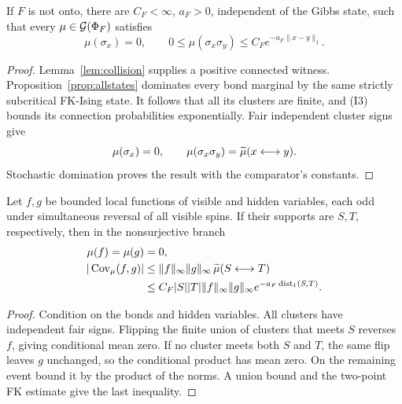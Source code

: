 \begin{proposition}\label{prop:nononto}
If \(F\) is not onto, there are \(C_F<\infty\), \(a_F>0\), independent of the Gibbs state, such that every \(\mu\in\mathcal G(\Phi_F)\) satisfies
\begin{equation}
 \mu(\sigma_x)=0,\qquad
 0\le\mu(\sigma_x\sigma_y)
   \le C_F e^{-a_F\|x-y\|_1}.
\end{equation}
\end{proposition}
\begin{proof}
Lemma~\ref{lem:collision} supplies a positive connected witness. Proposition~\ref{prop:allstates} dominates every bond marginal by the same strictly subcritical FK-Ising state. It follows that all its clusters are finite, and (I3) bounds its connection probabilities exponentially. Fair independent cluster signs give
\begin{equation}
 \mu(\sigma_x)=0,\qquad
 \mu(\sigma_x\sigma_y)=\widetilde\mu(x\longleftrightarrow y).
\end{equation}
Stochastic domination proves the result with the comparator's constants.
\end{proof}

\begin{corollary}\label{cor:odd}
Let \(f,g\) be bounded local functions of visible and hidden variables, each odd under simultaneous reversal of all visible spins. If their supports are \(S,T\), respectively, then in the nonsurjective branch
\begin{equation}
 \begin{aligned}
 \mu(f)=\mu(g)&=0,\\
 |\operatorname{Cov}_\mu(f,g)|
 &\le \|f\|_\infty\|g\|_\infty\,\widetilde\mu(S\longleftrightarrow T)\\
 &\le C_F |S||T|\|f\|_\infty\|g\|_\infty
       e^{-a_F\operatorname{dist}_1(S,T)}.
 \end{aligned}
\end{equation}
\end{corollary}
\begin{proof}
Condition on the bonds and hidden variables. All clusters have independent fair signs. Flipping the finite union of clusters that meets \(S\) reverses \(f\), giving conditional mean zero. If no cluster meets both \(S\) and \(T\), the same flip leaves \(g\) unchanged, so the conditional product has mean zero. On the remaining event bound it by the product of the norms. A union bound and the two-point FK estimate give the last inequality.
\end{proof}

